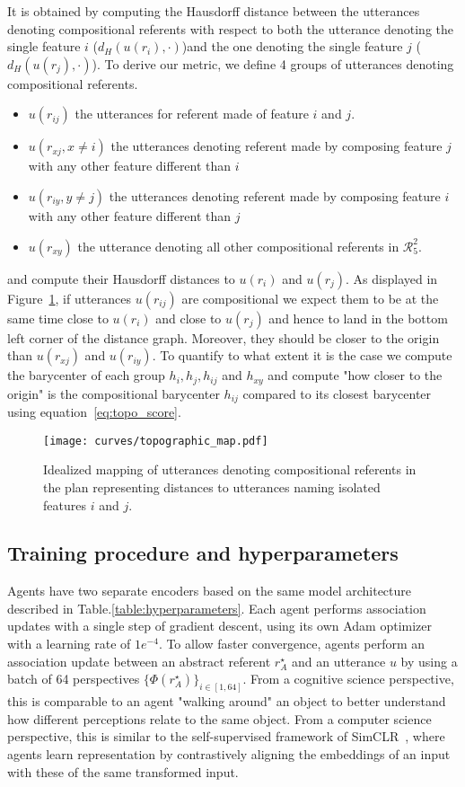 It is obtained by computing the Hausdorff distance between the utterances denoting compositional referents with respect to both the utterance denoting the single feature $i$ ($d_H(u(r_i),\cdot)$)and the one denoting the single feature $j$ ($d_H(u(r_j),\cdot)$). To derive our metric, we define 4 groups of utterances denoting compositional referents. 
\begin{itemize}[noitemsep,topsep=0pt]
    \item $u(r_{ij})$ the utterances for referent made of feature $i$ and $j$.
    \item $u(r_{xj}, x\neq i)$ the utterances denoting referent made by composing feature $j$ with any other feature different than $i$
    \item $u(r_{iy}, y\neq j)$ the utterances denoting referent made by composing feature $i$ with any other feature different than $j$
    \item $u(r_{xy})$ the utterance denoting all other compositional referents in $\mathcal{R}^2_5$.
\end{itemize}
%
and compute their Hausdorff distances to $u(r_i)$ and $u(r_j)$.
As displayed in Figure~\ref{fig:topo_distances_intuitive}, if utterances $u(r_{ij})$ are compositional we expect them to be at the same time close to $u(r_{i})$ and close to $u(r_{j})$ and hence to land in the bottom left corner of the distance graph. Moreover, they should be closer to the origin than $u(r_{xj})$ and $u(r_{iy})$. To quantify to what extent it is the case we compute the barycenter of each group $h_i, h_j, h_{ij}$ and $h_{xy}$ and compute "how closer to the origin" is the compositional barycenter $h_{ij}$ compared to its closest barycenter using equation~\ref{eq:topo_score}.
\begin{figure}[h!]
    \centering
    \texttt{[image: curves/topographic\_map.pdf]}
    \caption{Idealized mapping of utterances denoting compositional referents in the plan representing distances to utterances naming isolated features $i$ and $j$.}
    \label{fig:topo_distances_intuitive}
\end{figure}


\subsection{Training procedure and hyperparameters}
\label{sup:training_proc}
Agents have two separate encoders based on the same model architecture described in Table.\ref{table:hyperparameters}. Each agent performs association updates with a single step of gradient descent, using its own Adam optimizer with a learning rate of $1e^{-4}$. To allow faster convergence, agents perform an association update between an abstract referent $r^\star_A$ and an utterance $u$ by using a batch of 64 perspectives $\{\Phi(r^\star_A)\}_{i \in [1,64]}$. From a cognitive science perspective, this is comparable to an agent "walking around" an object to better understand how different perceptions relate to the same object. From a computer science perspective, this is similar to the self-supervised framework of SimCLR~\citep{Chen2020ASF}, where agents learn representation by contrastively aligning the embeddings of an input with these of the same transformed input.

